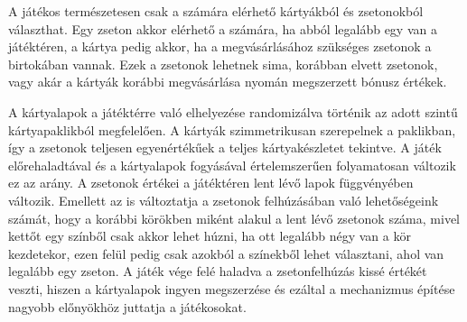 A játékos természetesen csak a számára elérhető kártyákból és zsetonokból választhat. Egy zseton akkor elérhető a számára, ha abból legalább egy van a játéktéren, a kártya pedig akkor, ha a megvásárlásához szükséges zsetonok a birtokában vannak. Ezek a zsetonok lehetnek sima, korábban elvett zsetonok, vagy akár a kártyák korábbi megvásárlása nyomán megszerzett bónusz értékek.

A kártyalapok a játéktérre való elhelyezése randomizálva történik az adott szintű kártyapaklikból megfelelően. A kártyák szimmetrikusan szerepelnek a paklikban, így a zsetonok teljesen egyenértékűek a teljes kártyakészletet tekintve. A játék előrehaladtával és a kártyalapok fogyásával értelemszerűen folyamatosan változik ez az arány. A zsetonok értékei a játéktéren lent lévő lapok függvényében változik. Emellett az is változtatja a zsetonok felhúzásában való lehetőségeink számát, hogy a korábbi körökben miként alakul a lent lévő zsetonok száma, mivel kettőt egy színből csak akkor lehet húzni, ha ott legalább négy van a kör kezdetekor, ezen felül pedig csak azokból a színekből lehet választani, ahol van legalább egy zseton. A játék vége felé haladva a zsetonfelhúzás kissé értékét veszti, hiszen a kártyalapok ingyen megszerzése és ezáltal a mechanizmus építése nagyobb előnyökhöz juttatja a játékosokat.
